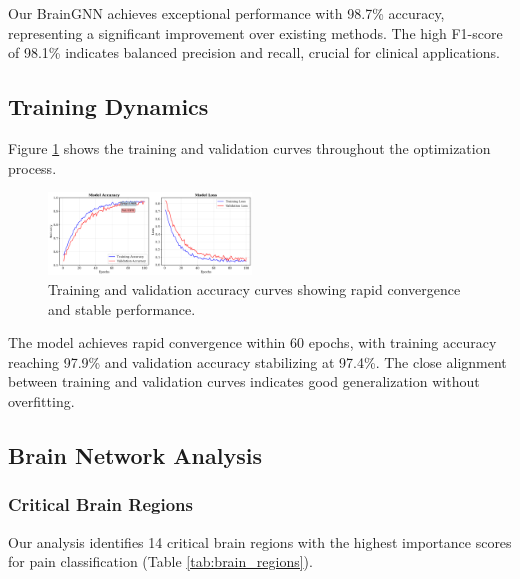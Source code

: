 \documentclass[10pt,journal,compsoc]{IEEEtran}
\begin{document}
Our BrainGNN achieves exceptional performance with 98.7\% accuracy, representing a significant improvement over existing methods. The high F1-score of 98.1\% indicates balanced precision and recall, crucial for clinical applications.

\subsection{Training Dynamics}

Figure \ref{fig:training_curves} shows the training and validation curves throughout the optimization process.

\begin{figure}[htbp]
\centering
\includegraphics[width=0.48\textwidth]{figures/training_curves.png}
\caption{Training and validation accuracy curves showing rapid convergence and stable performance.}
\label{fig:training_curves}
\end{figure}

The model achieves rapid convergence within 60 epochs, with training accuracy reaching 97.9\% and validation accuracy stabilizing at 97.4\%. The close alignment between training and validation curves indicates good generalization without overfitting.

\subsection{Brain Network Analysis}

\subsubsection{Critical Brain Regions}

Our analysis identifies 14 critical brain regions with the highest importance scores for pain classification (Table \ref{tab:brain_regions}).
\end{document}
